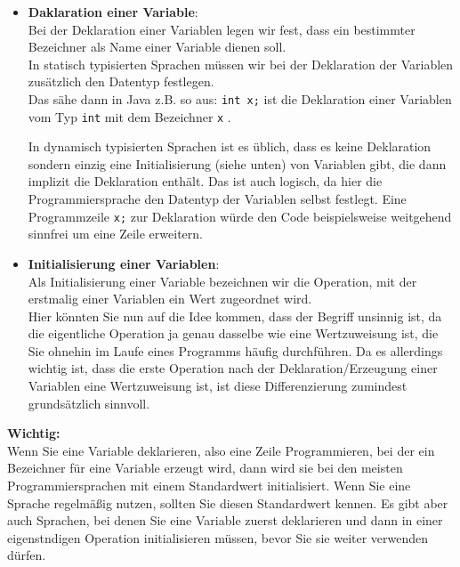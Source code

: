 \begin{itemize}
	\item \textbf{Daklaration einer Variable}:\\
	
	Bei der Deklaration einer Variablen legen wir fest, dass ein bestimmter Bezeichner als \glqq{}Name\grqq{} einer Variable dienen soll.\\
	
	In statisch typisierten Sprachen müssen wir bei der Deklaration der Variablen zusätzlich den Datentyp festlegen.\\
	
	Das sähe dann in Java z.B. so aus: \verb|int x;| ist die Deklaration einer Variablen vom Typ \verb|int| mit dem Bezeichner \verb|x| .
		
	In dynamisch typisierten Sprachen ist es üblich, dass es keine Deklaration sondern einzig eine Initialisierung (siehe unten) von Variablen gibt, die dann implizit die Deklaration enthält. Das ist auch logisch, da hier die Programmiersprache den Datentyp der Variablen selbst festlegt. Eine Programmzeile \verb|x;| zur Deklaration würde den Code beispielsweise weitgehend sinnfrei um eine Zeile erweitern.\\
	
	\item \textbf{Initialisierung einer Variablen}:\\
	
	Als Initialisierung einer Variable bezeichnen wir die Operation, mit der erstmalig einer Variablen ein Wert zugeordnet wird.\\
	
	Hier könnten Sie nun auf die Idee kommen, dass der Begriff unsinnig ist, da die eigentliche Operation ja genau dasselbe wie eine Wertzuweisung ist, die Sie ohnehin im Laufe eines Programms häufig durchführen. Da es allerdings wichtig ist, dass die erste Operation nach der Deklaration/Erzeugung einer Variablen eine Wertzuweisung ist, ist diese Differenzierung zumindest grundsätzlich sinnvoll.
\end{itemize}

\textbf{Wichtig:}\\

Wenn Sie eine Variable deklarieren, also eine Zeile Programmieren, bei der ein Bezeichner für eine Variable erzeugt wird, dann wird sie bei den meisten Programmiersprachen mit einem Standardwert initialisiert. Wenn Sie eine Sprache regelmäßig nutzen, sollten Sie diesen Standardwert kennen. Es gibt aber auch Sprachen, bei denen Sie eine Variable zuerst deklarieren und dann in einer eigenstndigen Operation initialisieren müssen, bevor Sie sie weiter verwenden dürfen.

